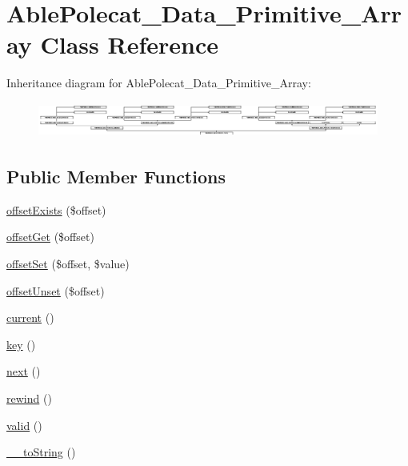 \hypertarget{class_able_polecat___data___primitive___array}{}\section{Able\+Polecat\+\_\+\+Data\+\_\+\+Primitive\+\_\+\+Array Class Reference}
\label{class_able_polecat___data___primitive___array}
Inheritance diagram for Able\+Polecat\+\_\+\+Data\+\_\+\+Primitive\+\_\+\+Array\+:\begin{figure}[H]
\begin{center}
\leavevmode
\includegraphics[height=1.166667cm]{class_able_polecat___data___primitive___array}
\end{center}
\end{figure}
\subsection*{Public Member Functions}
\begin{DoxyCompactItemize}
\item 
\hyperlink{class_able_polecat___data___primitive___array_a24ff257ec0c2221bc6fd7b1b4388e26e}{offset\+Exists} (\$offset)
\item 
\hyperlink{class_able_polecat___data___primitive___array_a59aee6e89465b48f014699f41b521f87}{offset\+Get} (\$offset)
\item 
\hyperlink{class_able_polecat___data___primitive___array_ac6bde6b1eb50eb5377e91771fe46b7a3}{offset\+Set} (\$offset, \$value)
\item 
\hyperlink{class_able_polecat___data___primitive___array_a2411227ea7118b13495de9839fd4b563}{offset\+Unset} (\$offset)
\item 
\hyperlink{class_able_polecat___data___primitive___array_af343507d1926e6ecf964625d41db528c}{current} ()
\item 
\hyperlink{class_able_polecat___data___primitive___array_a729e946b4ef600e71740113c6d4332c0}{key} ()
\item 
\hyperlink{class_able_polecat___data___primitive___array_acea62048bfee7b3cd80ed446c86fb78a}{next} ()
\item 
\hyperlink{class_able_polecat___data___primitive___array_ae619dcf2218c21549cb65d875bbc6c9c}{rewind} ()
\item 
\hyperlink{class_able_polecat___data___primitive___array_abb9f0d6adf1eb9b3b55712056861a247}{valid} ()
\item 
\hyperlink{class_able_polecat___data___primitive___array_a7516ca30af0db3cdbf9a7739b48ce91d}{\+\_\+\+\_\+to\+String} ()
\end{DoxyCompactItemize}

